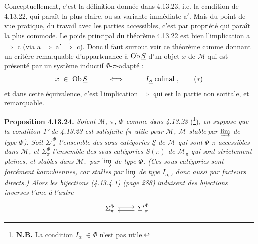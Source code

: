 Conceptuellement, c'est la définition donnée dans 4.13.23, i.e. la condition  de 4.13.22, qui paraît la plus claire, ou sa variante immédiate a$'$. Mais du point de vue pratique, du travail avec les parties accessibles, c'est par propriété  qui paraît la plus commode. Le poids principal du théorème 4.13.22 est bien
l'implication a $\Longrightarrow$ c (via a $\Longrightarrow$ a$'$ $\overset{!}{\Longrightarrow}$ c). Donc il faut surtout voir ce théorème comme donnant un critère remarquable d'appartenance à $\operatorname{Ob}\underline{S}$ d'un objet $x$ de $\mathcal{M}$ qui est présenté par un système inductif $\Phi$-$\pi$-adapté :
\[ x\ \in\ \Ob\underline{S}\qquad\quad\Longleftrightarrow\qquad\quad I_{\underline{S}}\ \text{cofinal}\ , \tag*{$(*)$} \]
et dans cette équivalence, c'est l'implication $\Longrightarrow$ qui est la partie non soritale, et remarquable.

\textbf{Proposition 4.13.24.} \textit{Soient $\mathcal{M}$, $\pi$, $\Phi$ comme dans 4.13.23} (\footnote{\textbf{N.B.} La condition $I_{\alpha_0}\in\Phi$ n'est pas utile.})\textit{, on suppose que la condition 1° de 4.13.23 est satisfaite ($\pi$ utile pour $\mathcal{M}$, $\mathcal{M}$ stable par $\varinjlim$ de type $\Phi$). Soit ${\Sigma'}^{\Phi}_{\pi}$ l'ensemble des sous-catégories $\underline{S}$ de $\mathcal{M}$ qui sont $\Phi$-$\pi$-accessibles dans $\mathcal{M}$, et $\Sigma^{\Phi}_{\pi}$ l'ensemble des sous-catégories $\underline{S}(\pi)$ de $\mathcal{M}_\pi$ qui sont strictement pleines, et stables dans $\mathcal{M}_\pi$ par $\varinjlim$ de type $\Phi$. (Ces sous-catégories sont forcément karoubiennes, car stables par $\varinjlim$ de type $I_{\alpha_0}$, donc aussi par facteurs directs.) Alors les bijections (4.13.4.1) (page 288) induisent des bijections inverses l'une à l'autre}
\[
\begin{tikzcd}
\Sigma^{\Phi}_{\pi} \arrow[r, shift left] & {\Sigma'}^{\Phi}_{\pi} \arrow[l, shift left]
\end{tikzcd}\ .
\]

